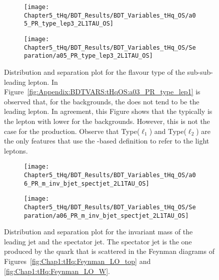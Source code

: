 \begin{figure}[h]
\centering
\begin{subfigure}{.45\textwidth}
  \centering
  \texttt{[image: Chapter5\_tHq/BDT\_Results/BDT\_Variables\_tHq\_OS/a05\_PR\_type\_lep3\_2L1TAU\_OS]}
\end{subfigure}%
\begin{subfigure}{.55\textwidth}
  \centering
  \texttt{[image: Chapter5\_tHq/BDT\_Results/BDT\_Variables\_tHq\_OS/Separation/a05\_PR\_type\_lep3\_2L1TAU\_OS]}
\end{subfigure}
\caption{Distribution and separation plot for the flavour type of the sub-sub-leading lepton. 
In Figure~\ref{fig:Appendix:BDTVARS:tHqOS:a03_PR_type_lep1} is observed that,
for the backgrounds,
the \tauhad does not  tend to be the leading lepton. In agreement, this Figure shows 
that the \tauhad typically is the lepton with lower \pT for the backgrounds.
However, this is not the case for the \tHq production.
Observe that Type($\ell_{1}$) and Type($\ell_{2}$) are the only features that use the \pT-based definition to refer to the light leptons.}
\label{fig:Appendix:BDTVARS:tHqOS:a05_PR_type_lep3}
\end{figure}

\begin{figure}[h]
\centering
\begin{subfigure}{.45\textwidth}
  \centering
  \texttt{[image: Chapter5\_tHq/BDT\_Results/BDT\_Variables\_tHq\_OS/a06\_PR\_m\_inv\_bjet\_spectjet\_2L1TAU\_OS]}
\end{subfigure}%
\begin{subfigure}{.55\textwidth}
  \centering
  \texttt{[image: Chapter5\_tHq/BDT\_Results/BDT\_Variables\_tHq\_OS/Separation/a06\_PR\_m\_inv\_bjet\_spectjet\_2L1TAU\_OS]}
\end{subfigure}
\caption{Distribution and separation plot for the invariant mass of the leading \btagged jet and the spectator jet.
The spectator jet is the one produced by the quark that is scattered in the Feynman diagrams of 
Figures~\ref{fig:Chap1:tHq:Feynman_LO_top} and \ref{fig:Chap1:tHq:Feynman_LO_W}.}
\label{fig:Appendix:BDTVARS:tHqOS:a06_PR_m_inv_bjet_spectjet}
\end{figure}

